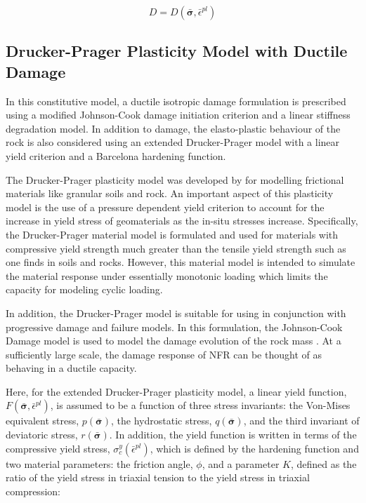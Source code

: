 \begin{equation}
D=D\left(\bar{\boldsymbol{\sigma}},\bar{\epsilon}^{pl}\right)
\label{eqn:gen8}
\end{equation}

\subsection{Drucker-Prager Plasticity Model with Ductile Damage}

In this constitutive model, a ductile isotropic damage formulation is prescribed using a modified Johnson-Cook damage initiation criterion and a linear stiffness degradation model. In addition to damage, the elasto-plastic behaviour of the rock is also considered using an extended Drucker-Prager model with a linear yield criterion and a Barcelona hardening function. 

The Drucker-Prager plasticity model was developed by \citet{drucker_implications_1950} for modelling frictional materials like granular soils and rock. An important aspect of this plasticity model is the use of a pressure dependent yield criterion to account for the increase in yield stress of geomaterials as the in-situ stresses increase. Specifically, the Drucker-Prager material model is formulated and used for materials with compressive yield strength much greater than the tensile yield strength such as one finds in soils and rocks. However, this material model is intended to simulate the material response under essentially monotonic loading which limits the capacity for modeling cyclic loading.

In addition, the Drucker-Prager model is suitable for using in conjunction with progressive damage and failure models. In this formulation, the Johnson-Cook Damage model is used to model the damage evolution of the rock mass \citep{Johnson_1985}. At a sufficiently large scale, the damage response of NFR can be thought of as behaving in a ductile capacity. 

Here, for the extended Drucker-Prager plasticity model, a linear yield function, $F\left(\bar{\boldsymbol{\sigma}}, \bar{\epsilon}^{pl}\right)$, is assumed to be a function of three stress invariants: the Von-Mises equivalent stress, $p\left(\bar{\boldsymbol{\sigma}}\right)$, the hydrostatic stress, $q\left(\bar{\boldsymbol{\sigma}}\right)$, and the third invariant of deviatoric stress, $r\left(\bar{\boldsymbol{\sigma}}\right)$. In addition, the yield function is written in terms of the compressive yield stress, $\sigma_c^y\left(\bar{\epsilon}^{pl}\right)$, which is defined by the hardening function and two material parameters: the friction angle, $\phi$, and a parameter $K$, defined as the ratio of the yield stress in triaxial tension to the yield stress in triaxial compression:

